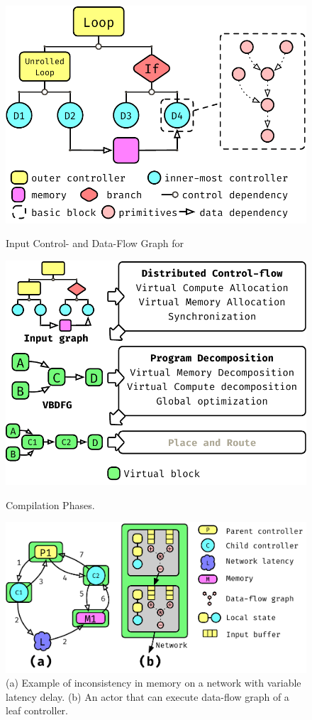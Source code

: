 \begin{figure}[!tbp]
\centering
\includegraphics[height=0.13\paperheight]{figures/controller_ir.pdf}
\caption{Input Control- and Data-Flow Graph for \name{}}
\label{fig:controller}
\centering
\includegraphics[width=0.8\columnwidth]{figures/compiler_pass.pdf}
\caption{Compilation Phases.}
\label{fig:flow}
\centering
\includegraphics[height=0.12\paperheight]{figures/memory_inconsistency_actor_execution.pdf}
\caption{(a) Example of inconsistency in memory on a network with variable latency delay. (b) An actor that can execute data-flow graph of a leaf controller.}\label{fig:centralctrl} 
\label{fig:actor}
\end{figure}

